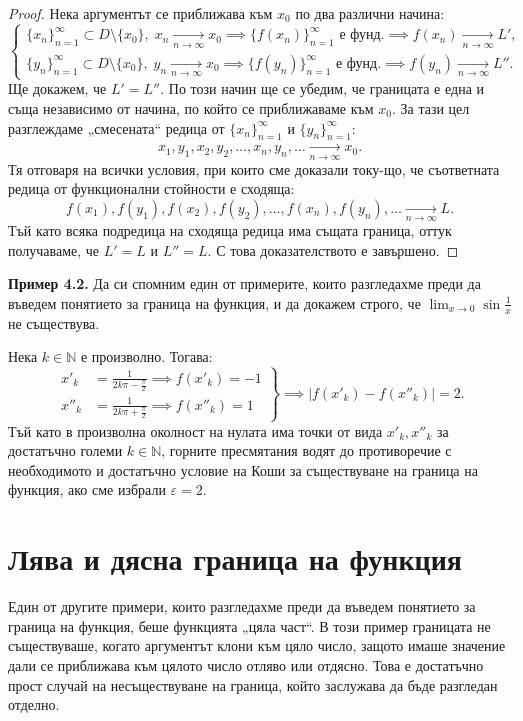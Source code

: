\begin{proof}
Нека аргументът се приближава към $x_0$ по два различни начина:
\[
\begin{cases}
\{x_n\}_{n=1}^{\infty} \subset D \setminus \{x_0\}, \; x_n \xrightarrow[n \to \infty]{} x_0 \implies \{f(x_n)\}_{n=1}^{\infty} \text{ е фунд.} \implies f(x_n) \xrightarrow[n \to \infty]{} L', \\
\{y_n\}_{n=1}^{\infty} \subset D \setminus \{x_0\}, \; y_n \xrightarrow[n \to \infty]{} x_0 \implies \{f(y_n)\}_{n=1}^{\infty} \text{ е фунд.} \implies f(y_n) \xrightarrow[n \to \infty]{} L''.
\end{cases}
\]
Ще докажем, че $L' = L''$. По този начин ще се убедим, че границата е една и съща независимо от начина, по който се приближаваме към $x_0$. За тази цел разглеждаме „смесената“ редица от $\{x_n\}_{n=1}^{\infty}$ и $\{y_n\}_{n=1}^{\infty}$:
\[
x_1, y_1, x_2, y_2, \dots, x_n, y_n, \dots \xrightarrow[n \to \infty]{} x_0.
\]
Тя отговаря на всички условия, при които сме доказали току-що, че съответната редица от функционални стойности е сходяща:
\[
f(x_1), f(y_1), f(x_2), f(y_2), \dots, f(x_n), f(y_n), \dots \xrightarrow[n \to \infty]{} L.
\]
Тъй като всяка подредица на сходяща редица има същата граница, оттук получаваме, че $L' = L$ и $L'' = L$. С това доказателството е завършено.
\end{proof}

\medskip
\noindent\textbf{Пример 4.2.} Да си спомним един от примерите, които разгледахме преди да въведем понятието за граница на функция, и да докажем строго, че $\lim_{x \to 0} \sin \frac{1}{x}$ не съществува.

Нека $k \in \mathbb{N}$ е произволно. Тогава:
\[
\left.
\begin{aligned}
x'_k &= \frac{1}{2k\pi - \frac{\pi}{2}} \implies f(x'_k) = -1 \\
x''_k &= \frac{1}{2k\pi + \frac{\pi}{2}} \implies f(x''_k) = 1
\end{aligned}
\right\} \implies |f(x'_k) - f(x''_k)| = 2.
\]
Тъй като в произволна околност на нулата има точки от вида $x'_k, x''_k$ за достатъчно големи $k \in \mathbb{N}$, горните пресмятания водят до противоречие с необходимото и достатъчно условие на Коши за съществуване на граница на функция, ако сме избрали $\varepsilon = 2$.

\section{Лява и дясна граница на функция}

Един от другите примери, които разгледахме преди да въведем понятието за граница на функция, беше функцията „цяла част“. В този пример границата не съществуваше, когато аргументът клони към цяло число, защото имаше значение дали се приближава към цялото число отляво или отдясно. Това е достатъчно прост случай на несъществуване на граница, който заслужава да бъде разгледан отделно.


